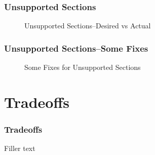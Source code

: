 \documentclass[english,10pt]{beamer}
\begin{document}
\begin{frame}
  \frametitle{Unsupported Sections}
  \begin{figure}
    
    \caption{Unsupported Sections--Desired vs Actual}
  \end{figure}
\end{frame}

\begin{frame}
  \frametitle{Unsupported Sections--Some Fixes}
  \begin{figure}
    
    \caption{Some Fixes for Unsupported Sections}
  \end{figure}
\end{frame}

\section{Tradeoffs}
\begin{frame}
  \frametitle{Tradeoffs}
  Filler text
\end{frame}
\end{document}
